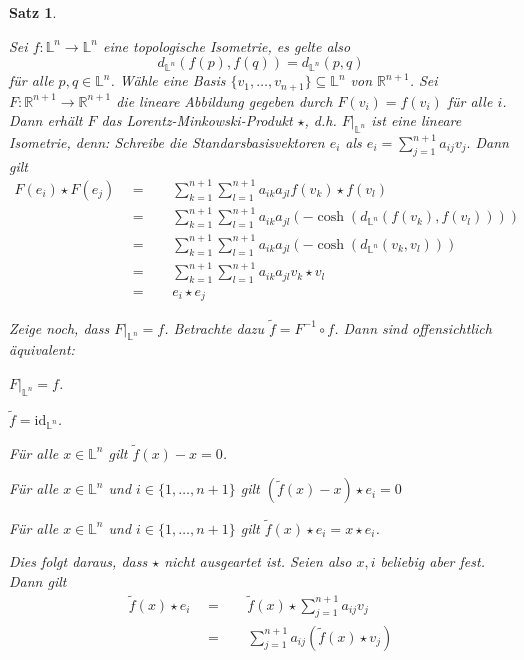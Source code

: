 \documentclass[11pt]{book}
\numberwithin{dummy}{section}
\newtheorem{theorem}{Satz}[section]
\theoremstyle{nonumberbreak}
\newenvironment{pr}[1][]{\ifthenelse{\equal{#1}{}}{\proof}{\proof[#1]}\rm}{\endproof}
\newcommand{\Loid}{\mathbb{L}}
\newcommand{\R}{\mathbb{R}}
\newcommand{\la}{\longrightarrow}
\newcommand{\id}{\mathrm{id}}
\begin{document}
\begin{spacing}{1.4}
\begin{theorem}
\begin{pr}
\begin{compactenum}
\item["$(iii) \rightarrow (i)$"] Sei $f: \Loid^n \la \Loid^n$ eine topologische Isometrie, es gelte also
$$d_{\Loid^n}(f(p), f(q)) = d_{\Loid^n}(p,q)$$
für alle $p,q \in \Loid^n$. Wähle eine Basis $\{v_1, \ldots, v_{n+1}\} \subseteq \Loid^n $ von $\R^{n+1}$. Sei $F: \R^{n+1} \la \R^{n+1}$ die lineare Abbildung gegeben durch $F(v_i) = f(v_i)$ für alle $i$. Dann erhält $F$ das Lorentz-Minkowski-Produkt $\star$, d.h. $F\vert_{\Loid^n}$ ist eine lineare Isometrie, denn: Schreibe die Standarsbasisvektoren $e_i$ als
$e_i = \sum_{j=1}^{n+1} a_{ij} v_j.$
Dann gilt 
\begin{alignat*}{5}
F(e_i) \star F(e_j) \ \ &=&& \ \ \sum_{k=1}^{n+1} \sum_{l=1}^{n+1} a_{ik}a_{jl} f(v_k) \star f(v_l) \\
&=&& \ \ \sum_{k=1}^{n+1} \sum_{l=1}^{n+1} a_{ik}a_{jl} \left(-\cosh \left( d_{\Loid^n}(f(v_k), f(v_l))\right) \right)\\
&=&& \ \ \sum_{k=1}^{n+1} \sum_{l=1}^{n+1} a_{ik}a_{jl} \left(-\cosh \left( d_{\Loid^n}(v_k, v_l)\right) \right)\\
&=&& \ \ \sum_{k=1}^{n+1} \sum_{l=1}^{n+1} a_{ik}a_{jl} v_k \star v_l \\
&=&& \ \ e_i \star e_j
\end{alignat*}
\end{compactenum}
Zeige noch, dass $F\vert_{\Loid^n} = f$. Betrachte dazu $\tilde{f}= F^{-1} \circ f$. Dann sind offensichtlich äquivalent:
\begin{compactenum}
\item[(1)] $F \vert_{\Loid^n} = f$.
\item[(2)] $\tilde{f}= \id_{\Loid^n}$.
\item[(3)] Für alle $x \in \Loid^n$ gilt $\tilde{f}(x) - x =0 $.
\item[(4)] Für alle $x \in \Loid^n$ und $i \in \{1, \ldots, n+1\}$ gilt $(\tilde{f}(x) - x)\star e_i=0$
\item[(5)] Für alle $x \in \Loid^n$ und $i \in \{1, \ldots, n+1\}$ gilt $\tilde{f}(x) \star e_i = x \star e_i$.
\end{compactenum}
Dies folgt daraus, dass $\star$ nicht ausgeartet ist. Seien also $x,i$ beliebig aber fest. Dann gilt 
\begin{alignat*}{5}
\tilde{f}(x) \star e_i \ \ &=&& \ \ \tilde{f}(x) \star \sum_{j=1}^{n+1} a_{ij} v_j \\
&=&& \ \ \sum_{j=1}^{n+1} a_{ij} \left( \tilde{f}(x) \star v_j \right)\\

\end{alignat*}
\end{pr}
\end{theorem}
\end{spacing}
\end{document}
